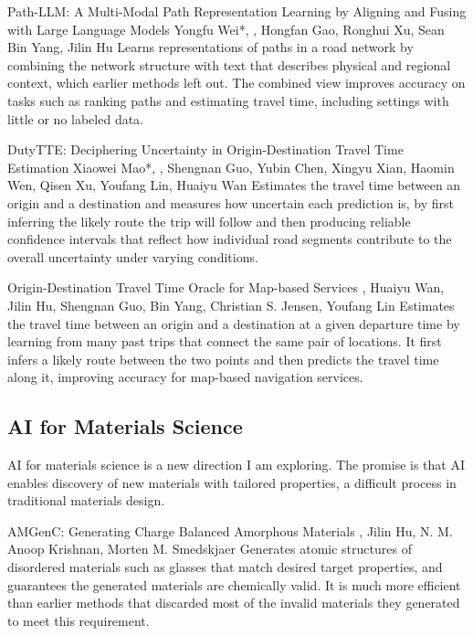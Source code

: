 {Path-LLM: A Multi-Modal Path Representation Learning by Aligning and Fusing with Large Language Models}
{Yongfu Wei*, \me*, Hongfan Gao, Ronghui Xu, Sean Bin Yang, Jilin Hu}
{Learns representations of paths in a road network by combining the network structure with text that describes physical and regional context, which earlier methods left out. The combined view improves accuracy on tasks such as ranking paths and estimating travel time, including settings with little or no labeled data.}

{DutyTTE: Deciphering Uncertainty in Origin-Destination Travel Time Estimation}
{Xiaowei Mao*, \me*, Shengnan Guo, Yubin Chen, Xingyu Xian, Haomin Wen, Qisen Xu, Youfang Lin, Huaiyu Wan}
{Estimates the travel time between an origin and a destination and measures how uncertain each prediction is, by first inferring the likely route the trip will follow and then producing reliable confidence intervals that reflect how individual road segments contribute to the overall uncertainty under varying conditions.}

{Origin-Destination Travel Time Oracle for Map-based Services}
{\me, Huaiyu Wan, Jilin Hu, Shengnan Guo, Bin Yang, Christian S. Jensen, Youfang Lin}
{Estimates the travel time between an origin and a destination at a given departure time by learning from many past trips that connect the same pair of locations. It first infers a likely route between the two points and then predicts the travel time along it, improving accuracy for map-based navigation services.}

\subsection*{AI for Materials Science}
AI for materials science is a new direction I am exploring. The promise is that AI enables discovery of new materials with tailored properties, a difficult process in traditional materials design.

{AMGenC: Generating Charge Balanced Amorphous Materials}
{\me, Jilin Hu, N. M. Anoop Krishnan, Morten M. Smedskjaer}
{Generates atomic structures of disordered materials such as glasses that match desired target properties, and guarantees the generated materials are chemically valid. It is much more efficient than earlier methods that discarded most of the invalid materials they generated to meet this requirement.}

